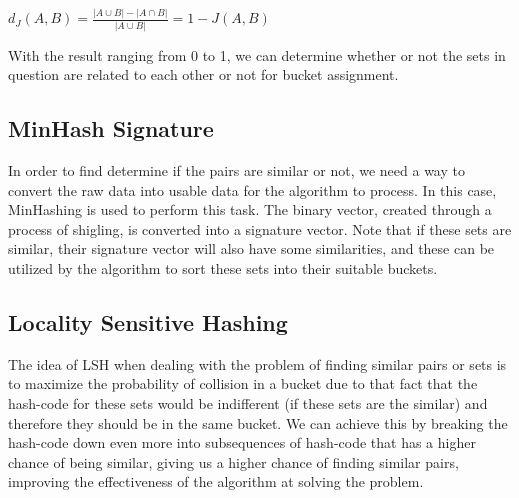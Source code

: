 \documentclass{article}
\begin{document}
$d_J(A,B) = \frac{|A \cup B| - |A \cap B|}{|A \cup B|} = 1 - J(A,B)
$

With the result ranging from 0 to 1, we can determine whether or not the sets in question are related to each other or not for bucket assignment.


\subsection{MinHash Signature}
In order to find determine if the pairs are similar or not, we need a way to convert the raw data into usable data for the algorithm to process. In this case, MinHashing is used to perform this task. The binary vector, created through a process of shigling, is converted into a signature vector. Note that if these sets are similar, their signature vector will also have some similarities, and these can be utilized by the algorithm to sort these sets into their suitable buckets.

\subsection{Locality Sensitive Hashing}
The idea of LSH when dealing with the problem of finding similar pairs or sets is to maximize the probability of collision in a bucket due to that fact that the hash-code for these sets would be indifferent (if these sets are the similar) and therefore they should be in the same bucket. We can achieve this by breaking the hash-code down even more into subsequences of hash-code that has a higher chance of being similar, giving us a higher chance of finding similar pairs, improving the effectiveness of the algorithm at solving the problem.
\end{document}
